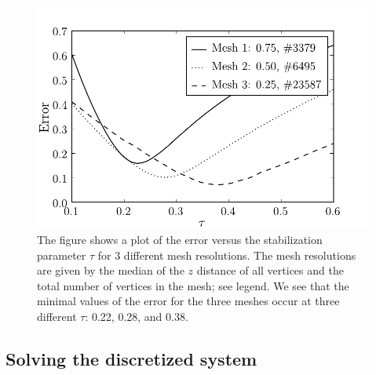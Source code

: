 \begin{figure}
  \label{fig:hake:error_plot}
  \includegraphics[width=\linewidth]{chapters/hake/pdf/error_plot}
  \caption[Error plot]{The figure shows a plot of the error versus the
    stabilization parameter $\tau$ for 3 different mesh
    resolutions. The mesh resolutions are given by the median of the
    $z$ distance of all vertices and the total number of vertices in
    the mesh; see legend. We see that the minimal values of the error
    for the three meshes occur at three different $\tau$: 0.22, 0.28,
    and 0.38.}
\end{figure}

\subsection{Solving the discretized system}

